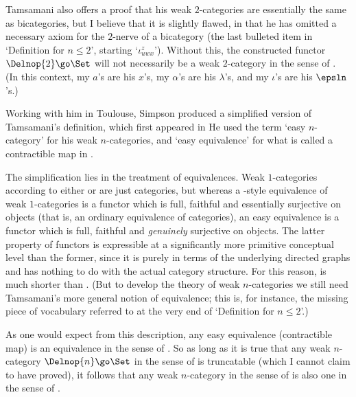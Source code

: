 Tamsamani also offers a proof that his weak $2$-categories are essentially
the same as bicategories, but I believe that it is slightly flawed, in that
he has omitted a necessary axiom for the $2$-nerve of a bicategory (the last
bulleted item in `Definition  for $n\leq 2$', starting
`$\iota_{uwx}^z$').  Without this, the constructed functor $\Delnop{2} \go
\Set$ will not necessarily be a weak $2$-category in the sense of .
(In this context, my $a$'s are his $x$'s, my $\alpha$'s are his $\lambda$'s,
and my $\iota$'s are his $\epsln$'s.)

Working with him in Toulouse, Simpson produced a simplified version of
Tamsamani's definition, which first appeared in
% 
%
% 
He used the term `easy $n$-category' for his weak $n$-categories, and `easy
equivalence' for what is called a contractible map in .

The simplification lies in the treatment of equivalences.  Weak
$1$-categories according to either  or  are just categories,
but whereas a -style equivalence of weak $1$-categories is a functor
which is full, faithful and essentially surjective on objects (that is, an
ordinary equivalence of categories), an easy equivalence is a functor which
is full, faithful and \emph{genuinely} surjective on objects.  The latter
property of functors is expressible at a significantly more primitive
conceptual level than the former, since it is purely in terms of the
underlying directed graphs and has nothing to do with the actual category
structure.  For this reason,  is much shorter than .  (But to
develop the theory of weak $n$-categories we still need Tamsamani's more
general notion of equivalence; this is, for instance, the missing piece of
vocabulary referred to at the very end of `Definition  for $n\leq
2$'.)

As one would expect from this description, any easy equivalence (contractible
map) is an equivalence in the sense of .  So as long as it is true
that any weak $n$-category $\Delnop{n} \go \Set$ in the sense of  is
truncatable (which I cannot claim to have proved), it follows that any weak
$n$-category in the sense of  is also one in the sense of .

